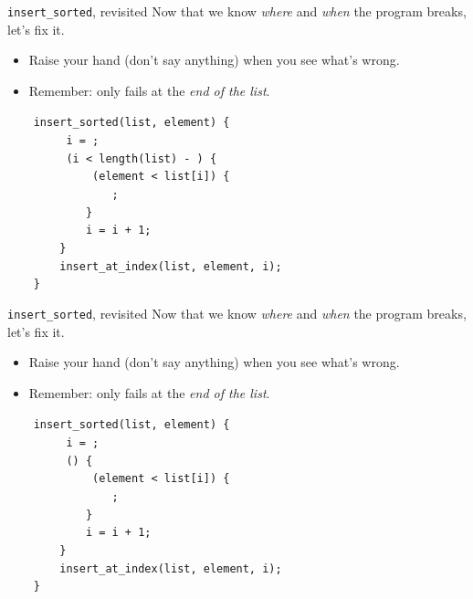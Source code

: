 \documentclass[xcolor=dvipsnames]{beamer}
\begin{document}
\begin{frame}{\texttt{insert\_sorted}, revisited}
	Now that we know {\em where} and {\em when} the program breaks, let's fix it.
	\begin{itemize}
		\item Raise your hand (don't say anything) when you see what's wrong.
		\item Remember: only fails at the {\em end of the list}.
	\end{itemize}

	\linegap
		\texttt{~~~~insert\_sorted(list,~element)~\{} \\
			\texttt{~~~~~~~~~i~=~;} \\
			\texttt{~~~~~~~~~(i~<~length(list)~-~)~\{} \\
		\texttt{~~~~~~~~~~~~~(element~<~list[i])~\{} \\
		\texttt{~~~~~~~~~~~~~~~~;} \\
		\texttt{~~~~~~~~~~~~\}} \\
		\texttt{~~~~~~~~~~~~i = i + 1;} \\
		\texttt{~~~~~~~~\}} \\
		\texttt{~~~~~~~~insert\_at\_index(list,~element,~i);} \\
		\texttt{~~~~\}} \\
\end{frame}
\begin{frame}{\texttt{insert\_sorted}, revisited}
	Now that we know {\em where} and {\em when} the program breaks, let's fix it.
	\begin{itemize}
		\item Raise your hand (don't say anything) when you see what's wrong.
		\item Remember: only fails at the {\em end of the list}.
	\end{itemize}

	\linegap
		\texttt{~~~~insert\_sorted(list,~element)~\{} \\
			\texttt{~~~~~~~~~i~=~;} \\
			\texttt{~~~~~~~~~()~\{~} \\
				\texttt{~~~~~~~~~~~~~(element~<~list[i])~\{~~~} \\
		\texttt{~~~~~~~~~~~~~~~~;} \\
		\texttt{~~~~~~~~~~~~\}} \\
		\texttt{~~~~~~~~~~~~i = i + 1;} \\
		\texttt{~~~~~~~~\}} \\
		\texttt{~~~~~~~~insert\_at\_index(list,~element,~i);} \\
		\texttt{~~~~\}} \\
\end{frame}
\end{document}
